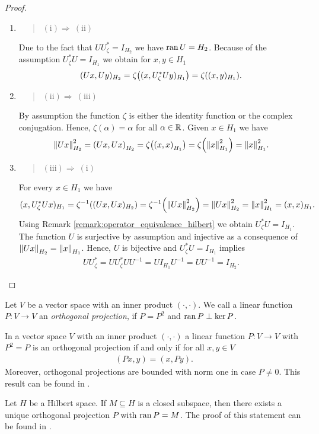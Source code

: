 \begin{proof}
	\begin{enumerate}
		\phantom{}
		\item[]\blockquote{$(\mathrm{i}) \Rightarrow \ (\mathrm{ii})$}. Due to the fact that $U U_\zeta^\ast = I_{H_2}$ we have $\ran U = H_2$. Because of the assumption $U_\zeta^\ast U = I_{H_1}$ we obtain for $x,y \in H_1$ 
		\begin{align*}
			(Ux, Uy)_{H_2} = \zeta\pbraces{(x, U_\zeta^\ast U y)_{H_1}} = \zeta \pbraces{(x,y)_{H_1}}.
		\end{align*}
		
		\item[]\blockquote{$(\mathrm{ii}) \Rightarrow \ (\mathrm{iii})$}. By assumption the function $\zeta$ is either the identity function or the complex conjugation. Hence, $\zeta(\alpha) = \alpha$ for all $\alpha \in \R$. Given $x \in H_1$ we have
		\begin{align*}
			\norm[H_2]{Ux}^2 = \pbraces{Ux, Ux}_{H_2} = \zeta\pbraces{\pbraces{x, x}_{H_1}} = \zeta\pbraces{\norm[H_1]{x}^2} = \norm[H_1]{x}^2.
		\end{align*} 
		
		\item[]\blockquote{$(\mathrm{iii}) \Rightarrow \ (\mathrm{i})$}. For every $x \in H_1$ we have 
		\begin{align*}
			(x, U_\zeta^\ast U x)_{H_1} = \zeta^{-1}\pbraces{(Ux, Ux)_{H_2}} = \zeta^{-1} \pbraces{\norm[H_2]{Ux}^2} = \norm[H_2]{Ux}^2 = \norm[H_1]{x}^2 = (x,x)_{H_1}.
		\end{align*}
		Using Remark \ref{remark:operator_equivalence_hilbert} we obtain $U_\zeta^\ast U = I_{H_1}$. The function $U$ is surjective by assumption and injective as a consequence of $\norm[H_2]{Ux} = \norm[H_1]{x}$. Hence, $U$ is bijective and $U_\zeta^\ast U = I_{H_1}$ implies
		\begin{align*}
			U U_\zeta^\ast = U U_\zeta^\ast UU^{-1} = UI_{H_1}U^{-1} = UU^{-1} = I_{H_2}.
		\end{align*}
	\end{enumerate}
\end{proof}


\begin{definition}
	Let $V$ be a vector space with an inner product $(\cdot, \cdot)$. We call a linear function $P: V \to V$ an \textit{orthogonal projection}, if $P = P^2$ and $\ran P \perp \ker P$.
\end{definition}


\begin{remark}
	In a vector space $V$ with an inner product $(\cdot, \cdot)$ a linear function $P: V \to V$ with $P^2 = P$ is an orthogonal projection if and only if for all $x,y \in V$
	\begin{align*}
		(Px, y) = (x,Py).
	\end{align*}
	Moreover, orthogonal projections are bounded with norm one in case $P \neq 0$. This result can be found in \cite[p. 47]{FAna1}.
\end{remark}


\begin{remark} \label{remark:orth_proj_uniqueness}
	Let $H$ be a Hilbert space. If $M \subseteq H$ is a closed subspace, then there exists a unique orthogonal projection $P$ with $\ran P = M$. The proof of this statement can be found in \cite[p. 48]{FAna1}.
\end{remark}